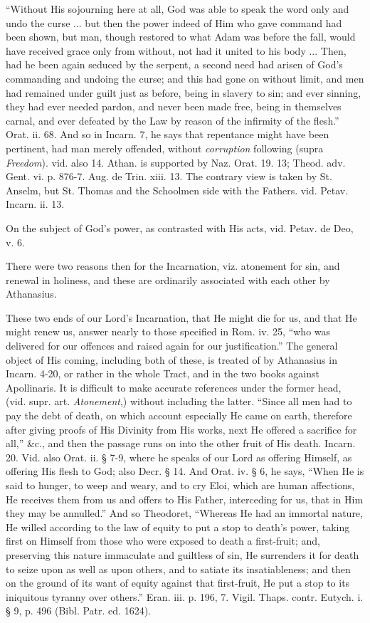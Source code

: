 ``Without His sojourning here at all, God was able
to speak the word only and undo the curse ... but then the power
indeed of Him who gave command had been shown, but man, though
restored to what Adam was before the fall, would have received grace
only from without, not had it united to his body ... Then, had he been
again seduced by the serpent, a second need had arisen of God's
commanding and undoing the curse; and this had gone on without limit,
and men had remained under guilt just as before, being in slavery to
sin; and ever sinning, they had ever needed pardon, and never been
made free, being in themselves carnal, and ever defeated by the Law by
reason of the infirmity of the flesh.'' Orat. ii. 68. And so in
Incarn. 7, he says that repentance might have been pertinent, had man
merely offended, without \emph{corruption} following (supra \emph{Freedom}).
vid. also 14. Athan. is supported by Naz. Orat. 19. 13; Theod. adv.
Gent. vi. p. 876-7. Aug. de Trin. xiii. 13. The contrary view is taken
by St. Anselm, but St. Thomas and the Schoolmen side with the Fathers.
vid. Petav. Incarn. ii. 13.

On the subject of God's power, as contrasted with
His acts, vid. Petav. de Deo, v. 6.

There were two reasons then for the Incarnation,
viz. atonement for sin, and renewal in holiness, and these are
ordinarily associated with each other by Athanasius.

These two ends of our Lord's Incarnation, that He
might die for us, and that He might renew us, answer nearly to those
specified in Rom. iv. 25, ``who was delivered for our offences and
raised again for our justification.'' The general object of His coming,
including both of these, is treated of by Athanasius in Incarn. 4-20,
or rather in the whole Tract, and in the two books against Apollinaris.
It is difficult to make accurate references under the former head, (vid.
supr. art. \emph{Atonement},) without including the latter. ``Since all
men had to pay the debt of death, on which account especially He came
on earth, therefore after giving proofs of His Divinity from His
works, next He offered a sacrifice for all,'' \&c., and then the
passage runs on into the other fruit of His death. Incarn. 20. Vid.
also Orat. ii. § 7-9, where he speaks of our Lord as offering
Himself, as offering His flesh to God; also Decr. § 14. And Orat. iv.
§ 6, he says, ``When He is said to hunger, to weep and weary,
and to cry Eloi, which are human affections, He receives them from us
and offers to His Father, interceding for us, that in Him they may be
annulled.'' And so Theodoret, ``Whereas He had an immortal nature, He
willed according to the law of equity to put a stop to death's power,
taking first on Himself from those who were exposed to death a
first-fruit; and, preserving this nature immaculate and guiltless of
sin, He surrenders it for death to seize upon as well as upon others,
and to satiate its insatiableness; and then on the ground of its want
of equity against that first-fruit, He put a stop to its iniquitous
tyranny over others.'' Eran. iii. p. 196, 7. Vigil. Thaps. contr.
Eutych. i. § 9, p. 496 (Bibl. Patr. ed. 1624).

